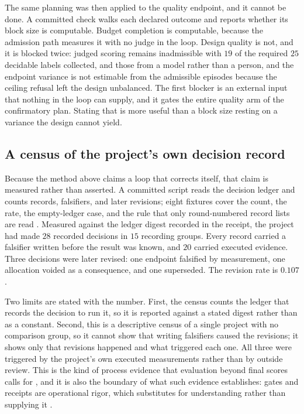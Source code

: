 \documentclass[11pt,a4paper]{article}
\begin{document}
The same planning was then applied to the quality endpoint, and it cannot be done. A
committed check walks each declared outcome and reports whether its block size is
computable. Budget completion is computable, because the admission path measures it with
no judge in the loop. Design quality is not, and it is blocked twice: judged scoring remains inadmissible with $19$ of the required $25$ decidable labels collected, and those from a model rather than a person, and the endpoint
variance is not estimable from the admissible episodes because the ceiling refusal left
the design unbalanced. The first blocker is an external input that nothing in the loop can
supply, and it gates the entire quality arm of the confirmatory plan. Stating that is more
useful than a block size resting on a variance the design cannot yield.

\subsection{A census of the project's own decision record}

Because the method above claims a loop that corrects itself, that claim is
measured rather than asserted. A committed script reads the decision ledger and
counts records, falsifiers, and later revisions; eight fixtures cover the count,
the rate, the empty-ledger case, and the rule that only round-numbered record
lists are read \citep{seqmeta2026}. Measured against the ledger digest recorded in
the receipt, the project had made $28$ recorded decisions in $15$ recording
groups. Every record carried a falsifier written before the result was known, and
$20$ carried executed evidence. Three decisions were later revised: one endpoint
falsified by measurement, one allocation voided as a consequence, and one
superseded. The revision rate is $0.107$.

Two limits are stated with the number. First, the census counts the ledger that
records the decision to run it, so it is reported against a stated digest rather
than as a constant. Second, this is a descriptive census of a single project with
no comparison group, so it cannot show that writing falsifiers caused the
revisions; it shows only that revisions happened and what triggered each one. All
three were triggered by the project's own executed measurements rather than by
outside review. This is the kind of process evidence that evaluation beyond final
scores calls for \citep{beyondfinalscores2026}, and it is also the boundary of what
such evidence establishes: gates and receipts are operational rigor, which
substitutes for understanding rather than supplying it \citep{rigorai2026}.
\end{document}
